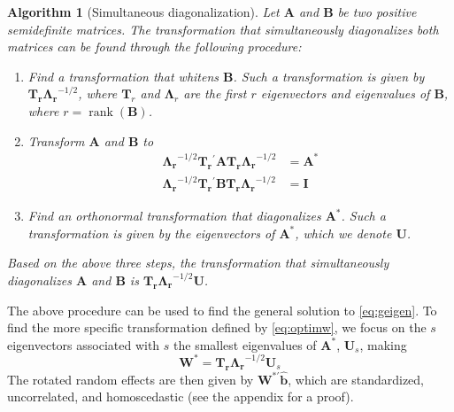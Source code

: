 \documentclass[12pt]{article} %
\newtheorem{algorithm}[theorem]{Algorithm}
\newcommand{\trans}{\ensuremath{^\prime}}
\DeclareMathOperator{\rank}{rank}
\begin{document}
\begin{algorithm}[Simultaneous diagonalization]
Let $\bm{A}$ and $\bm{B}$ be two positive semidefinite matrices. The transformation that simultaneously diagonalizes both matrices can be found through the following procedure:
\begin{enumerate}
\item Find a transformation that whitens $\bm{B}$. Such a transformation is given by $\bm{T_r \Lambda_r}^{-1/2}$, where $\bm{T}_r$ and $\bm{\Lambda}_r$ are the first $r$  eigenvectors and eigenvalues of $\bm{B}$, where $r = \rank(\bm{B})$. 

\item Transform $\bm{A}$ and $\bm{B}$ to
\begin{align}
\bm{\Lambda_r}^{-1/2} \bm{T_r}\trans \bm{A T_r \Lambda_r}^{-1/2} &= \bm{A}^* \label{eq:astar} \\
\bm{\Lambda_r}^{-1/2} \bm{T_r}\trans \bm{B T_r \Lambda_r}^{-1/2} &= \bm{I}
\end{align}

\item Find an orthonormal transformation that diagonalizes $\bm{A}^*$. Such a transformation is given by the eigenvectors of $\bm{A}^*$, which we denote $\bm{U}$.
\end{enumerate}

Based on the above three steps, the transformation that simultaneously diagonalizes $\bm{A}$ and $\bm{B}$ is $\bm{T_r \Lambda_r}^{-1/2} \bm{U}$.\\ 
\end{algorithm}

The above procedure can be used to find the general solution to \eqref{eq:geigen}. To find the more specific transformation defined by \eqref{eq:optimw}, we focus on the $s$ eigenvectors associated with $s$ the smallest eigenvalues of $\bm{A}^*$, $\bm{U}_s$, making
%
\begin{equation}\label{eq:w}
\bm{W}^* = \bm{T_r \Lambda_r}^{-1/2} \bm{U}_s
\end{equation}
%
The rotated random effects are then given by $\bm{W}^{*\prime} \widehat{\bm{b}}$, which are standardized, uncorrelated, and homoscedastic (see the appendix for a proof).

\end{document}
